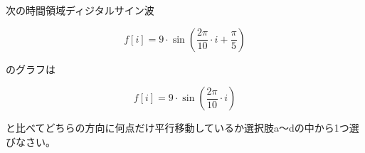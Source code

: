 次の時間領域ディジタルサイン波 

\[
f[i] = 9 \cdot \sin \left ( \frac{2 \pi}{10}  \cdot i + \frac{\pi}{5} \right )
\]

\noindent のグラフは

\[
f[i] = 9 \cdot \sin \left ( \frac{2 \pi}{10}  \cdot i \right )
\]

\noindent と比べてどちらの方向に何点だけ平行移動しているか選択肢a〜dの中から1つ選びなさい。
